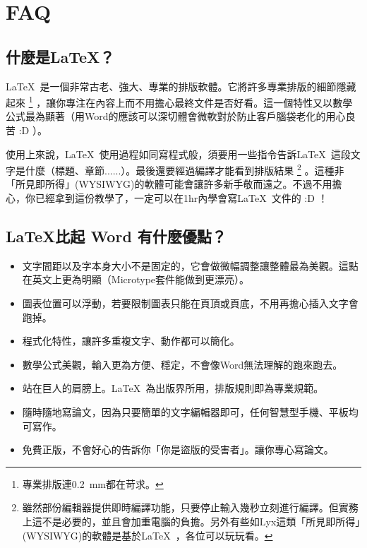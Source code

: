 \documentclass[class=NCU_thesis, crop=false, float=true]{standalone}
\begin{document}
\let\orilabel\label %

\chapter{FAQ}
\label{sec:c_faq}
\section{什麼是\LaTeX ？}
\LaTeX\  是一個非常古老、強大、專業的排版軟體。它將許多專業排版的細節隱藏起來
\footnote{專業排版連\SI{0.2}{\milli\metre}都在苛求。}
，讓你專注在內容上而不用擔心最終文件是否好看。這一個特性又以數學公式最為顯著（用Word的應該可以深切體會微軟對於防止客戶腦袋老化的用心良苦 :D ）。

使用上來說，\LaTeX\ 使用過程如同寫程式般，須要用一些指令告訴\LaTeX\ 這段文字是什麼（標題、章節......）。最後還要經過編譯才能看到排版結果
\footnote{雖然部份編輯器提供即時編譯功能，只要停止輸入幾秒立刻進行編譯。但實務上這不是必要的，並且會加重電腦的負擔。另外有些如Lyx這類「所見即所得」(WYSIWYG)的軟體是基於\LaTeX\ ，各位可以玩玩看。}
。這種非「所見即所得」(WYSIWYG)的軟體可能會讓許多新手敬而遠之。不過不用擔心，你已經拿到這份教學了，一定可以在1hr內學會寫\LaTeX\ 文件的 :D ！

\section{\LaTeX 比起 Word 有什麼優點？}
\begin{itemize}
    \item 文字間距以及字本身大小不是固定的，它會做微幅調整讓整體最為美觀。這點在英文上更為明顯（Microtype套件能做到更漂亮）。
    \item 圖表位置可以浮動，若要限制圖表只能在頁頂或頁底，不用再擔心插入文字會跑掉。
    \item 程式化特性，讓許多重複文字、動作都可以簡化。
    \item 數學公式美觀，輸入更為方便、穩定，不會像Word無法理解的跑來跑去。
    \item 站在巨人的肩膀上。\LaTeX\ 為出版界所用，排版規則即為專業規範。
    \item 隨時隨地寫論文，因為只要簡單的文字編輯器即可，任何智慧型手機、平板均可寫作。
    \item 免費正版，不會好心的告訴你「你是盜版的受害者」。讓你專心寫論文。
\end{itemize}
\end{document}
